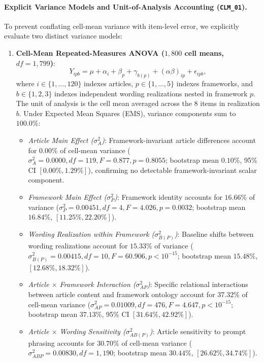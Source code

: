 \paragraph{Explicit Variance Models and Unit-of-Analysis Accounting (\texttt{CLM\_01}).}
To prevent conflating cell-mean variance with item-level error, we explicitly evaluate two distinct variance models:
\begin{enumerate}
    \item \textbf{Cell-Mean Repeated-Measures ANOVA ($1{,}800$ cell means, $df = 1{,}799$)}:
    \begin{equation}
        Y_{ipb} = \mu + \alpha_i + \beta_p + \gamma_{b(p)} + (\alpha\beta)_{ip} + \epsilon_{ipb},
        \label{eq:cell_mean_anova}
    \end{equation}
    where $i \in \{1,\ldots,120\}$ indexes articles, $p \in \{1,\ldots,5\}$ indexes frameworks, and $b \in \{1,2,3\}$ indexes independent wording realizations nested in framework $p$. The unit of analysis is the cell mean averaged across the 8 items in realization $b$.
    Under Expected Mean Squares (EMS), variance components sum to $100.0\%$:
    \begin{itemize}
        \item \emph{Article Main Effect ($\sigma^2_A$)}: Framework-invariant article differences account for $\mathbf{0.00\%}$ of cell-mean variance ($\sigma^2_A = 0.0000, df = 119, F = 0.877, p = 0.8055$; bootstrap mean $0.10\%$, 95\% CI $[0.00\%, 1.29\%]$), confirming no detectable framework-invariant scalar component.
        \item \emph{Framework Main Effect ($\sigma^2_P$)}: Framework identity accounts for $\mathbf{16.66\%}$ of variance ($\sigma^2_P = 0.00451, df = 4, F = 4.026, p = 0.0032$; bootstrap mean $16.84\%$, $[11.25\%, 22.20\%]$).
        \item \emph{Wording Realization within Framework ($\sigma^2_{B(P)}$)}: Baseline shifts between wording realizations account for $\mathbf{15.33\%}$ of variance ($\sigma^2_{B(P)} = 0.00415, df = 10, F = 60.906, p < 10^{-15}$; bootstrap mean $15.48\%$, $[12.68\%, 18.32\%]$).
        \item \emph{Article $\times$ Framework Interaction ($\sigma^2_{AP}$)}: Specific relational interactions between article content and framework ontology account for $\mathbf{37.32\%}$ of cell-mean variance ($\sigma^2_{AP} = 0.01009, df = 476, F = 4.647, p < 10^{-15}$; bootstrap mean $\mathbf{37.13\%}$, 95\% CI $[31.64\%, 42.92\%]$).
        \item \emph{Article $\times$ Wording Sensitivity ($\sigma^2_{AB(P)}$)}: Article sensitivity to prompt phrasing accounts for $\mathbf{30.70\%}$ of cell-mean variance ($\sigma^2_{ABP} = 0.00830, df = 1{,}190$; bootstrap mean $30.44\%$, $[26.62\%, 34.74\%]$).
    \end{itemize}


\end{enumerate}

